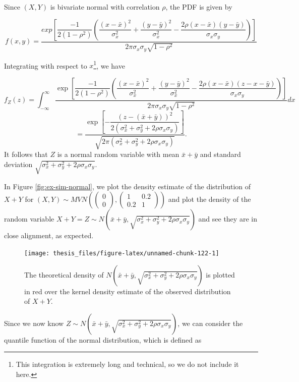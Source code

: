 \documentclass[12pt,twoside]{smiththesis}
\begin{document}
Since \((X,Y)\) is bivariate normal with correlation \(\rho\), the PDF is given by

\[f(x,y) = \dfrac{exp\left[\dfrac{-1}{2(1-\rho^2)} \left( \dfrac{(x-\bar x)^2}{\sigma_x^2}+\dfrac{(y-\bar y)^2}{\sigma_x^2} - \dfrac{2 \rho (x-\bar x)(y-\bar y)}{\sigma_x\sigma_y} \right)\right]}{2\pi \sigma_x \sigma_y \sqrt{1- \rho^2}}\]

Integrating with respect to \(x\)\footnote{This integration is extremely long and technical, so we do not include it here.}, we have

\[f_Z(z)  = \int_{-\infty}^\infty \dfrac{\exp\left[\dfrac{-1}{2(1-\rho^2)} \left( \dfrac{(x-\bar x)^2}{\sigma_x^2}+\dfrac{(y-\bar y)^2}{\sigma_x^2} - \dfrac{2 \rho (x-\bar x)(z-x-\bar y)}{\sigma_x\sigma_y} \right)\right]}{2\pi \sigma_x \sigma_y \sqrt{1- \rho^2}} dx \]
\[=\dfrac{\exp\left[-\dfrac{(z-(\bar x + \bar y ))^2}{2(\sigma^2_x+\sigma^2_y + 2\rho \sigma_x \sigma_y)}\right]}{\sqrt{2\pi(\sigma_x^2 + \sigma_y^2 + 2\rho \sigma_x \sigma_y)}}.\]
It follows that \(Z\) is a normal random variable with mean \(\bar x + \bar y\) and standard deviation \(\sqrt{\sigma_x^2 +\sigma_y^2 + 2 \rho \sigma_x \sigma_y }\).

In Figure \ref{fig:ex-sim-normal}, we plot the density estimate of the distribution of \(X+Y\) for \((X,Y) \sim MVN\left( \begin{pmatrix} 0\\0 \end{pmatrix}, \begin{pmatrix} 1 & 0.2 \\0.2 & 1 \end{pmatrix}\right)\) and plot the density of the random variable \(X+Y = Z \sim N\left(\bar x + \bar y,\sqrt{\sigma_x^2 +\sigma_y^2 + 2 \rho \sigma_x \sigma_y }\right)\) and see they are in close alignment, as expected.
\begin{figure}

{\centering \texttt{[image: thesis\_files/figure-latex/unnamed-chunk-122-1]} 

}

\caption{\label{fig:ex-sim-normal} The theoretical density of $N\left(\bar x + \bar y,\sqrt{\sigma_x^2 +\sigma_y^2 + 2 \rho \sigma_x \sigma_y }\right)$ is plotted in red over the kernel density estimate of the observed distribution of $X+Y$.}\label{fig:unnamed-chunk-122}
\end{figure}
Since we now know \(Z \sim N\left(\bar x + \bar y,\sqrt{\sigma_x^2 +\sigma_y^2 + 2 \rho \sigma_x \sigma_y }\right)\), we can consider the quantile function of the normal distribution, which is defined as
\end{document}
